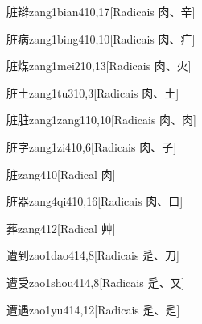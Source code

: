 \begin{entry}{脏辫}{zang1bian4}{10,17}[Radicais ⾁、⾟]
\end{entry}

\begin{entry}{脏病}{zang1bing4}{10,10}[Radicais ⾁、⽧]
\end{entry}

\begin{entry}{脏煤}{zang1mei2}{10,13}[Radicais ⾁、⽕]
\end{entry}

\begin{entry}{脏土}{zang1tu3}{10,3}[Radicais ⾁、⼟]
\end{entry}

\begin{entry}{脏脏}{zang1zang1}{10,10}[Radicais ⾁、⾁]
\end{entry}

\begin{entry}{脏字}{zang1zi4}{10,6}[Radicais ⾁、⼦]
\end{entry}

\begin{entry}{脏}{zang4}{10}[Radical ⾁]
\end{entry}

\begin{entry}{脏器}{zang4qi4}{10,16}[Radicais ⾁、⼝]
\end{entry}

\begin{entry}{葬}{zang4}{12}[Radical ⾋]
\end{entry}

\begin{entry}{遭到}{zao1dao4}{14,8}[Radicais ⾡、⼑]
\end{entry}

\begin{entry}{遭受}{zao1shou4}{14,8}[Radicais ⾡、⼜]
\end{entry}

\begin{entry}{遭遇}{zao1yu4}{14,12}[Radicais ⾡、⾡]
\end{entry}

